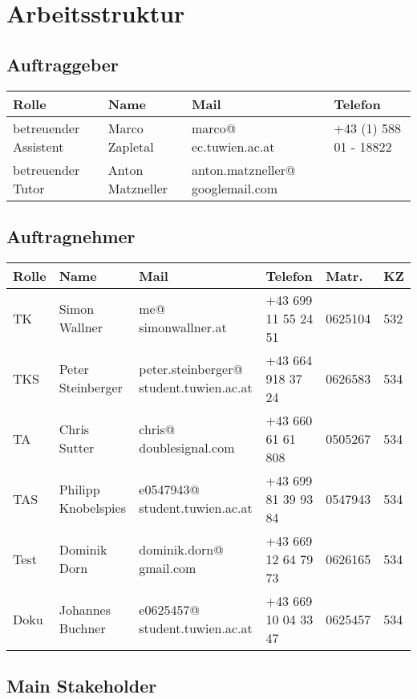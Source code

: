
\section{Arbeitsstruktur}
\subsection{Auftraggeber}
\begin{tabular}{ | l | l | p{3.5cm} | p{4cm} |}
\hline
\textbf{Rolle} & \textbf{Name} & \textbf{Mail} & \textbf{Telefon} \\
\hline
betreuender Assistent & Marco Zapletal & marco@ ec.tuwien.ac.at & +43 (1) 588 01 - 18822 \\
\hline
betreuender Tutor & Anton Matzneller & anton.matzneller@ googlemail.com &  \\
\hline
\end{tabular}

\subsection{Auftragnehmer}
\begin{tabular}{ | l | l | p{4cm} | p{2cm} | l | l |}
\hline
\textbf{Rolle} & \textbf{Name} & \textbf{Mail} & \textbf{Telefon} & \textbf{Matr.} & \textbf{KZ} \\
\hline
TK & Simon Wallner & me@ simonwallner.at & +43 699 11 55 24 51 & 0625104 & 532 \\
\hline
TKS & Peter Steinberger & peter.steinberger@ student.tuwien.ac.at & +43 664 918 37 24 & 0626583 & 534 \\
\hline
TA & Chris Sutter & chris@ doublesignal.com & +43 660 61 61 808 & 0505267 & 534 \\
\hline
TAS & Philipp Knobelspies & e0547943@ student.tuwien.ac.at & +43 699 81 39 93 84 & 0547943 & 534 \\
\hline
Test & Dominik Dorn & dominik.dorn@ gmail.com & +43 669 12 64 79 73 & 0626165 & 534 \\
\hline
Doku & Johannes Buchner & e0625457@ student.tuwien.ac.at & +43 669 10 04 33 47 & 0625457 & 534 \\
\hline
\end{tabular}

\subsection{Main Stakeholder}

